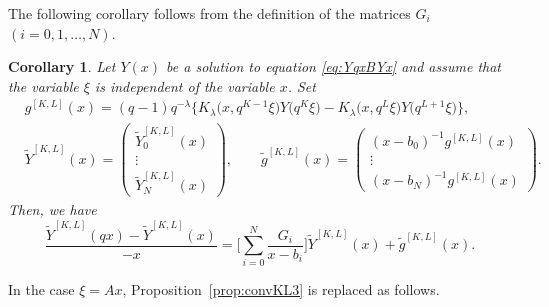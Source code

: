 \documentclass[pdftex]{sigma}
\numberwithin{equation}{section}
\newtheorem{Corollary}[Theorem]{Corollary}
\theoremstyle{definition}
\begin{document}
The following corollary follows from the definition of the matrices $G_{i}$ $(i=0,1,\dots ,N)$.
\begin{Corollary} \label{cor:convKLti}
Let $Y(x)$ be a solution to equation \eqref{eq:YqxBYx} and assume that the variable $\xi $ is independent of the variable $x$.
Set
\begin{align*}
& g^{[K,L]}(x) = (q-1) q^{-\lambda } \bigl\{ K_{\lambda}\bigl(x, q^{K-1} \xi\bigr)Y\bigl(q^{K} \xi\bigr) - K_{\lambda}\bigl(x, q^{L} \xi\bigr)Y\bigl(q^{L+1} \xi\bigr) \bigr\} , \\
& \widetilde{Y}^{[K,L]} (x) = \begin{pmatrix} \widetilde{Y}^{[K,L]}_{0}(x) \\ \vdots \\ \widetilde{Y}^{[K,L]}_{N}(x) \end{pmatrix} ,\qquad
 \widetilde{g}^{[K,L]} (x) = \begin{pmatrix} (x - b_{0})^{-1} g^{[K,L]}(x) \\ \vdots \\ (x - b_{N})^{-1} g^{[K,L]}(x) \end{pmatrix}.
\end{align*}
Then, we have
\begin{equation*}
\frac{\widetilde{Y} ^{[K,L]} (q x) - \widetilde{Y} ^{[K,L]} (x )}{-x} = \Biggl[ \sum^{N}_{i = 0}\frac{G_{i}}{x -b_{i}} \Biggr] \widetilde{Y} ^{[K,L]} (x) + \widetilde{g}^{[K,L]} (x).
\end{equation*}
\end{Corollary}
In the case $\xi =Ax$, Proposition~\ref{prop:convKL3} is replaced as follows.
\end{document}
